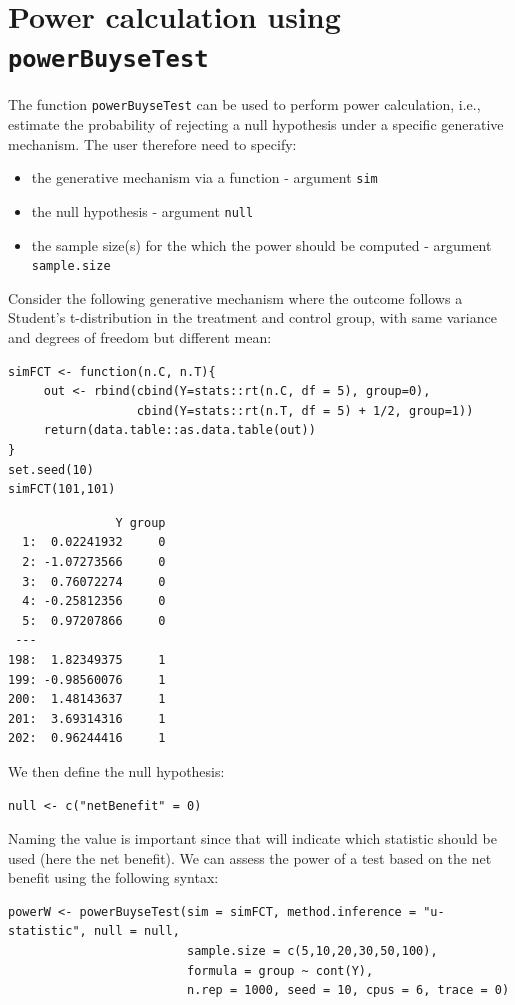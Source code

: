 \documentclass[12pt]{article}
\begin{document}
\section{Power calculation using \texttt{powerBuyseTest}}
\label{sec:org4265aae}

The function \texttt{powerBuyseTest} can be used to perform power
calculation, i.e., estimate the probability of rejecting a null
hypothesis under a specific generative mechanism. The user therefore
need to specify:
\begin{itemize}
\item the generative mechanism via a function \hfill - argument \texttt{sim}
\item the null hypothesis \hfill - argument \texttt{null}
\item the sample size(s) for the which the power should be computed  \hfill - argument \texttt{sample.size}
\end{itemize}

\bigskip

Consider the following generative mechanism where the outcome follows
a Student's t-distribution in the treatment and control group, with same
variance and degrees of freedom but different mean:
\lstset{language=r,label= ,caption= ,captionpos=b,numbers=none}
\begin{lstlisting}
simFCT <- function(n.C, n.T){
     out <- rbind(cbind(Y=stats::rt(n.C, df = 5), group=0),
                  cbind(Y=stats::rt(n.T, df = 5) + 1/2, group=1))
     return(data.table::as.data.table(out))
}
set.seed(10)
simFCT(101,101)
\end{lstlisting}

\begin{verbatim}
               Y group
  1:  0.02241932     0
  2: -1.07273566     0
  3:  0.76072274     0
  4: -0.25812356     0
  5:  0.97207866     0
 ---                  
198:  1.82349375     1
199: -0.98560076     1
200:  1.48143637     1
201:  3.69314316     1
202:  0.96244416     1
\end{verbatim}

We then define the null hypothesis:
\lstset{language=r,label= ,caption= ,captionpos=b,numbers=none}
\begin{lstlisting}
null <- c("netBenefit" = 0)
\end{lstlisting}

Naming the value is important since that will indicate which statistic
should be used (here the net benefit). We can assess the power of a
test based on the net benefit using the following syntax:
\lstset{language=r,label= ,caption= ,captionpos=b,numbers=none}
\begin{lstlisting}
powerW <- powerBuyseTest(sim = simFCT, method.inference = "u-statistic", null = null,
                         sample.size = c(5,10,20,30,50,100),                         
                         formula = group ~ cont(Y), 
                         n.rep = 1000, seed = 10, cpus = 6, trace = 0)
\end{lstlisting}
\end{document}
